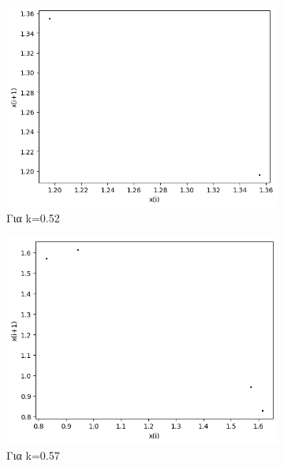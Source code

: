 \begin{figure}[h!]
\begin{subfigure}[b]{0.4\textwidth}
		\centering
		\includegraphics[width=\textwidth]{LateX images/graphs q07/g5}
		\caption{Για k=0.52}
		\label{f:k39}
	\end{subfigure}
	\hfill
	\begin{subfigure}[b]{0.4\textwidth}
		\centering
		\includegraphics[width=\textwidth]{LateX images/graphs q07/g6}
		\caption{Για k=0.57}
		\label{f:k40}
	\end{subfigure}
	\hfill
	\begin{subfigure}[b]{0.4\textwidth}
		\centering

\end{subfigure}
\end{figure}
